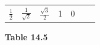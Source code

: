 {{\begin{center}
\begin{tabular}[t]{|l|l|l|l|l|l|l|}
                  \begin{math}\frac{1}{2}\end{math}
                 &
    
    
        
                  \begin{math}\frac{1}{\sqrt{2}}\end{math}
                 &
    
    
        
                  \begin{math}\frac{\sqrt{3}}{2}\end{math}
                 &
    
    
        1 &
    
    
        0%
     \tabularnewline\cline{1-1}\cline{2-2}\cline{3-3}\cline{4-4}\cline{5-5}\cline{6-6}\cline{7-7}
    \end{tabular}
      \end{center}
    \begin{center}{\small\bfseries Table 14.5}\end{center}
    
    \addtocounter{footnote}{-0}
    
          }{ %
        
    
}}
